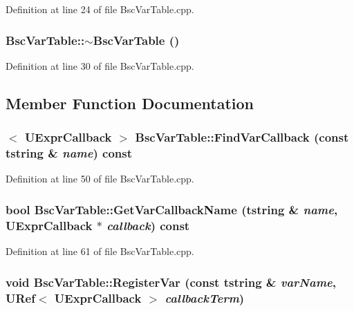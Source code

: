 Definition at line 24 of file BscVarTable.cpp.\hypertarget{class_bsc_var_table_f319d39ba041ac06caf94d5924e18cea}{
\subsubsection[{$\sim$BscVarTable}]{\setlength{\rightskip}{0pt plus 5cm}BscVarTable::$\sim$BscVarTable ()}}
\label{class_bsc_var_table_f319d39ba041ac06caf94d5924e18cea}




Definition at line 30 of file BscVarTable.cpp.

\subsection{Member Function Documentation}
\hypertarget{class_bsc_var_table_99981703077f5c8d7af15452682f2123}{
\subsubsection[{FindVarCallback}]{$<$ {\bf UExprCallback} $>$ BscVarTable::FindVarCallback (const {\bf tstring} \& {\em name}) const}}
\label{class_bsc_var_table_99981703077f5c8d7af15452682f2123}




Definition at line 50 of file BscVarTable.cpp.\hypertarget{class_bsc_var_table_36a70f0711ba55827d6a596a246644a7}{
\subsubsection[{GetVarCallbackName}]{\setlength{\rightskip}{0pt plus 5cm}bool BscVarTable::GetVarCallbackName ({\bf tstring} \& {\em name}, \/  {\bf UExprCallback} $\ast$ {\em callback}) const}}
\label{class_bsc_var_table_36a70f0711ba55827d6a596a246644a7}




Definition at line 61 of file BscVarTable.cpp.\hypertarget{class_bsc_var_table_eccd623b3da9a4d350b8563f90d0f6b6}{
\subsubsection[{RegisterVar}]{\setlength{\rightskip}{0pt plus 5cm}void BscVarTable::RegisterVar (const {\bf tstring} \& {\em varName}, \/  {\bf URef}$<$ {\bf UExprCallback} $>$ {\em callbackTerm})}}
\label{class_bsc_var_table_eccd623b3da9a4d350b8563f90d0f6b6}




